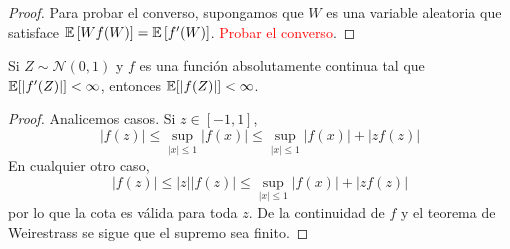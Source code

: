 \documentclass[main.tex]{subfiles}
\begin{document}
\begin{theorem}
\begin{proof}
        Para probar el converso, supongamos que $W$ es una variable aleatoria que satisface $\operatorname{\mathbb{E}}\left[Wf(W)\right] = \operatorname{\mathbb{E}}\left[f'(W)\right]$. \textcolor{red}{Probar el converso}.
    \end{proof}
\end{theorem}

\begin{lemma}\label{lemma:stein-f1}
    Si $Z\sim \mathcal{N}(0, 1)$ y $f$ es una función absolutamente continua tal que $\operatorname{\mathbb{E}}[|f'(Z)|] < \infty$, entonces $\operatorname{\mathbb{E}}[| f(Z) |] < \infty$.
    \begin{proof}
        Analicemos casos. Si $z \in [-1, 1]$, 
        \begin{equation*}
            |f(z)| \leq \sup_{|x|\leq 1} |f(x)| \leq \sup_{|x|\leq 1} |f(x)| + |zf(z)|
        \end{equation*}
        En cualquier otro caso, 
        \begin{equation*}
            |f(z)| \leq |z||f(z)| \leq  \sup_{|x|\leq 1} |f(x)| + |zf(z)|
        \end{equation*}
        por lo que la cota es válida para toda $z$. De la continuidad de $f$ y el teorema de Weirestrass se sigue que el supremo sea finito.
    \end{proof}
\end{lemma}
\end{document}
